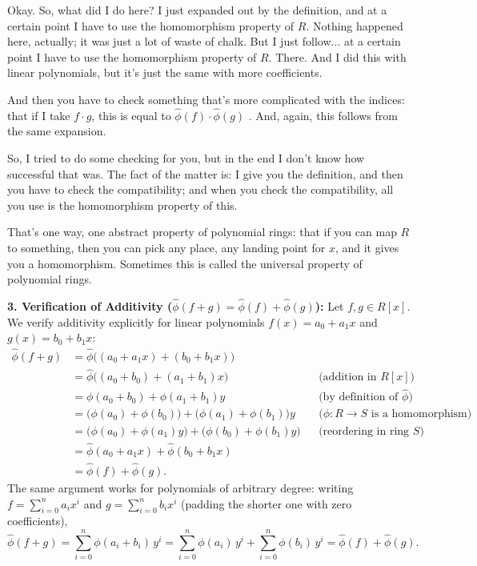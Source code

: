 \begin{proofWrapper}
\begin{speech}[00:14:25 - 00:16:30]
Okay. So, what did I do here? I just expanded out by the definition, and at a certain point I have to use the homomorphism property of $R$. Nothing happened here, actually; it was just a lot of waste of chalk. But I just follow... at a certain point I have to use the homomorphism property of $R$. There. And I did this with linear polynomials, but it's just the same with more coefficients.

And then you have to check something that's more complicated with the indices: that if I take $f \cdot g$, this is equal to $\hat{\phi}(f) \cdot \hat{\phi}(g)$ . And, again, this follows from the same expansion.

So, I tried to do some checking for you, but in the end I don't know how successful that was. The fact of the matter is: I give you the definition, and then you have to check the compatibility; and when you check the compatibility, all you use is the homomorphism property of this.

That's one way, one abstract property of polynomial rings: that if you can map $R$ to something, then you can pick any place, any landing point for $x$, and it gives you a homomorphism. Sometimes this is called the universal property of polynomial rings.
\end{speech}

\begin{content}
\textbf{3. Verification of Additivity ($\hat{\phi}(f + g) = \hat{\phi}(f) + \hat{\phi}(g)$):}
Let $f, g \in R[x]$. We verify additivity explicitly for linear polynomials $f(x) = a_0 + a_1 x$ and $g(x) = b_0 + b_1 x$:
\begin{align}
    \hat{\phi}(f + g) &= \hat{\phi}\bigl( (a_0 + a_1 x) + (b_0 + b_1 x) \bigr) \nonumber \\
    &= \hat{\phi}\bigl( (a_0 + b_0) + (a_1 + b_1) x \bigr) && \text{(addition in $R[x]$)} \nonumber \\
    &= \phi(a_0 + b_0) + \phi(a_1 + b_1) y && \text{(by definition of $\hat{\phi}$)} \nonumber \\
    &= \bigl(\phi(a_0) + \phi(b_0)\bigr) + \bigl(\phi(a_1) + \phi(b_1)\bigr) y && \text{($\phi \colon R \to S$ is a homomorphism)} \nonumber \\
    &= \bigl(\phi(a_0) + \phi(a_1) y\bigr) + \bigl(\phi(b_0) + \phi(b_1) y\bigr) && \text{(reordering in ring $S$)} \nonumber \\
    &= \hat{\phi}(a_0 + a_1 x) + \hat{\phi}(b_0 + b_1 x) \nonumber \\
    &= \hat{\phi}(f) + \hat{\phi}(g). \label{eq:additivity-check}
\end{align}
The same argument works for polynomials of arbitrary degree: writing $f = \sum_{i=0}^n a_i x^i$ and $g = \sum_{i=0}^n b_i x^i$ (padding the shorter one with zero coefficients),
\[
\hat{\phi}(f + g) = \sum_{i=0}^n \phi(a_i + b_i) \, y^i = \sum_{i=0}^n \phi(a_i) \, y^i + \sum_{i=0}^n \phi(b_i) \, y^i = \hat{\phi}(f) + \hat{\phi}(g).
\]
\end{content}


\end{proofWrapper}
